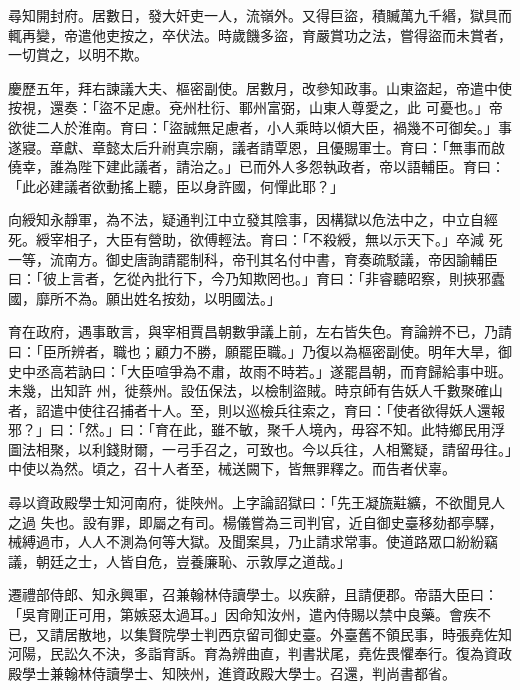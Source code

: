 \begin{pinyinscope}
 尋知開封府。居數日，發大奸吏一人，流嶺外。又得巨盜，積贓萬九千緡，獄具而輒再變，帝遣他吏按之，卒伏法。時歲饑多盜，育嚴賞功之法，嘗得盜而未賞者，一切賞之，以明不欺。



 慶歷五年，拜右諫議大夫、樞密副使。居數月，改參知政事。山東盜起，帝遣中使按視，還奏：「盜不足慮。兗州杜衍、鄆州富弼，山東人尊愛之，此
 可憂也。」帝欲徙二人於淮南。育曰：「盜誠無足慮者，小人乘時以傾大臣，禍幾不可御矣。」事遂寢。章獻、章懿太后升祔真宗廟，議者請覃恩，且優賜軍士。育曰：「無事而啟僥幸，誰為陛下建此議者，請治之。」已而外人多怨執政者，帝以語輔臣。育曰：「此必建議者欲動搖上聽，臣以身許國，何憚此耶？」



 向綬知永靜軍，為不法，疑通判江中立發其陰事，因構獄以危法中之，中立自經死。綬宰相子，大臣有營助，欲傅輕法。育曰：「不殺綬，無以示天下。」卒減
 死一等，流南方。御史唐詢請罷制科，帝刊其名付中書，育奏疏駁議，帝因諭輔臣曰：「彼上言者，乞從內批行下，今乃知欺罔也。」育曰：「非睿聽昭察，則挾邪蠹國，靡所不為。願出姓名按劾，以明國法。」



 育在政府，遇事敢言，與宰相賈昌朝數爭議上前，左右皆失色。育論辨不已，乃請曰：「臣所辨者，職也；顧力不勝，願罷臣職。」乃復以為樞密副使。明年大旱，御史中丞高若訥曰：「大臣喧爭為不肅，故雨不時若。」遂罷昌朝，而育歸給事中班。未幾，出知許
 州，徙蔡州。設伍保法，以檢制盜賊。時京師有告妖人千數聚確山者，詔遣中使往召捕者十人。至，則以巡檢兵往索之，育曰：「使者欲得妖人還報邪？」曰：「然。」曰：「育在此，雖不敏，聚千人境內，毋容不知。此特鄉民用浮圖法相聚，以利錢財爾，一弓手召之，可致也。今以兵往，人相驚疑，請留毋往。」中使以為然。頃之，召十人者至，械送闕下，皆無罪釋之。而告者伏辜。



 尋以資政殿學士知河南府，徙陜州。上字論詔獄曰：「先王凝旒黈纊，不欲聞見人之過
 失也。設有罪，即屬之有司。楊儀嘗為三司判官，近自御史臺移劾都亭驛，械縛過市，人人不測為何等大獄。及聞案具，乃止請求常事。使道路眾口紛紛竊議，朝廷之士，人皆自危，豈養廉恥、示敦厚之道哉。」



 遷禮部侍郎、知永興軍，召兼翰林侍讀學士。以疾辭，且請便郡。帝語大臣曰：「吳育剛正可用，第嫉惡太過耳。」因命知汝州，遣內侍賜以禁中良藥。會疾不已，又請居散地，以集賢院學士判西京留司御史臺。外臺舊不領民事，時張堯佐知
 河陽，民訟久不決，多詣育訴。育為辨曲直，判書狀尾，堯佐畏懼奉行。復為資政殿學士兼翰林侍讀學士、知陜州，進資政殿大學士。召還，判尚書都省。




\end{pinyinscope}
